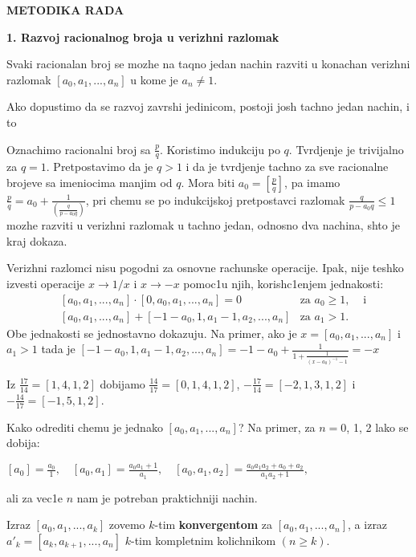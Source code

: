 \documentclass[11pt]{article}
\newcommand{\D}{\displaystyle}
\begin{document}
\newpage
\begin{center}
    \textbf{\Large{METODIKA RADA}}
\end{center}
\textbf{\large 1. Razvoj racionalnog broja u verizhni razlomak}
\begin{te}
Svaki racionalan broj se mozhe na taqno jedan nachin razviti u konachan verizhni razlomak $[a_0, a_1, . . . , a_n]$ u kome je $a_n\ne 1$.
\end{te}
Ako dopustimo da se razvoj zavrshi jedinicom, postoji josh tachno jedan nachin, i to 
\begin{dok}
Oznachimo racionalni broj sa $\frac{p}{q}$. Koristimo indukciju po $q$. Tvrdjenje je trivijalno za $q=1$. Pretpostavimo da je $q>1$ i da je tvrdjenje tachno za sve racionalne brojeve sa imeniocima manjim od $q$. Mora biti $a_0=\left[\frac{p}{q}\right ]$, pa imamo $\frac{p}{q}=a_0+\frac{1}{(\frac{q}{p-a_0 q})}$, pri chemu se po indukcijskoj pretpostavci razlomak $\frac{q}{p-a_0 q}\leq 1$ mozhe razviti u verizhni razlomak u tachno jedan, odnosno dva nachina, shto je kraj dokaza.
\end{dok}
Verizhni razlomci nisu pogodni za osnovne rachunske operacije. Ipak, nije teshko izvesti operacije $x \to 1/x$ i $x \to -x$ pomoc1u njih, korish{}c1enjem jednakosti:
\begin{align*}
    &[a_0,a_1,...,a_n] \cdot [0,a_0,a_1,...,a_n]=0 &\text{za } a_0\geq 1,& \text{ i}\\
    &[a_0,a_1,...,a_n] + [-1-a_0,1,a_1-1,a_2,...,a_n] &\text{za } a_1>1.&
\end{align*}
Obe jednakosti se jednostavno dokazuju. Na primer, ako je $x=[a_0,a_1,...,a_n]$ i $a_1>1$ tada je  $[-1-a_0,1,a_1-1,a_2,...,a_n]=-1-a_0+\frac{1}{1+\frac{1}{(x-a_0)^{-1}-1}}=-x$
\begin{pr}
Iz $\frac{17}{14}=[1,4,1,2]$ dobijamo $\frac{14}{17}=[0,1,4,1,2]$, $-\frac{17}{14}=[-2,1,3,1,2]$ i $-\frac{14}{17}=[-1,5,1,2]$.
\end{pr}
Kako odrediti chemu je jednako $[a_0,a_1,...,a_n]$? Na primer, za $n=$0, 1, 2 lako se dobija:\\[-3mm]
\begin{center}
$\D[a_0]=\frac{a_0}{1},\quad \D[a_0,a_1]=\frac{a_0a_1+1}{a_1},\quad\D[a_0,a_1,a_2]=\frac{a_0a_1a_2+a_0+a_2}{a_1a_2+1},$\\
\end{center}
ali za vec1e $n$ nam je potreban praktichniji nachin.
\begin{df}
Izraz $[a_0,a_1,...,a_k]$ zovemo $k$-tim \textbf{konvergentom} za $[a_0,a_1,...,a_n]$, a izraz \\$a'_k=[a_k,a_{k+1},...,a_n]$ $k$-tim kompletnim kolichnikom $(n \geq k)$.
\end{df}
\end{document}
